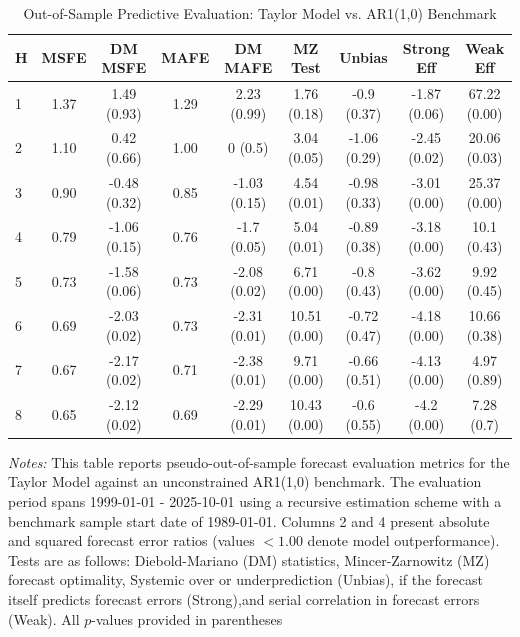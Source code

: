 \begin{table}[htbp]
\centering
\caption{Out-of-Sample Predictive Evaluation: Taylor Model vs. AR1(1,0) Benchmark}
\label{tab:taylor_model_evaluation}
\footnotesize
\begin{tabular}{l cccccccc}
\hline\hline
\rule{0pt}{3ex}
\textbf{H} & \textbf{MSFE} & \textbf{DM MSFE} & \textbf{MAFE} & \textbf{DM MAFE} & \textbf{MZ Test} & \textbf{Unbias} & \textbf{Strong Eff} & \textbf{Weak Eff} \\[0.5ex]
\hline
\rule{0pt}{2.5ex}
1 & 1.37 & 1.49 (0.93) & 1.29 & 2.23 (0.99) & 1.76 (0.18) & -0.9 (0.37) & -1.87 (0.06) & 67.22 (0.00) \\
2 & 1.10 & 0.42 (0.66) & 1.00 & 0 (0.5) & 3.04 (0.05) & -1.06 (0.29) & -2.45 (0.02) & 20.06 (0.03) \\
3 & 0.90 & -0.48 (0.32) & 0.85 & -1.03 (0.15) & 4.54 (0.01) & -0.98 (0.33) & -3.01 (0.00) & 25.37 (0.00) \\
4 & 0.79 & -1.06 (0.15) & 0.76 & -1.7 (0.05) & 5.04 (0.01) & -0.89 (0.38) & -3.18 (0.00) & 10.1 (0.43) \\
5 & 0.73 & -1.58 (0.06) & 0.73 & -2.08 (0.02) & 6.71 (0.00) & -0.8 (0.43) & -3.62 (0.00) & 9.92 (0.45) \\
6 & 0.69 & -2.03 (0.02) & 0.73 & -2.31 (0.01) & 10.51 (0.00) & -0.72 (0.47) & -4.18 (0.00) & 10.66 (0.38) \\
7 & 0.67 & -2.17 (0.02) & 0.71 & -2.38 (0.01) & 9.71 (0.00) & -0.66 (0.51) & -4.13 (0.00) & 4.97 (0.89) \\
8 & 0.65 & -2.12 (0.02) & 0.69 & -2.29 (0.01) & 10.43 (0.00) & -0.6 (0.55) & -4.2 (0.00) & 7.28 (0.7) \\
\hline\hline
\end{tabular}%
\par\smallskip
\parbox{\textwidth}{\scriptsize \textit{Notes:} This table reports pseudo-out-of-sample forecast evaluation metrics for the Taylor Model against an unconstrained AR1(1,0) benchmark. The evaluation period spans 1999-01-01 - 2025-10-01 using a recursive estimation scheme with a benchmark sample start date of 1989-01-01. Columns 2 and 4 present absolute and squared forecast error ratios (values $< 1.00$ denote model outperformance). Tests are as follows: Diebold-Mariano (DM) statistics, Mincer-Zarnowitz (MZ) forecast optimality, Systemic over or underprediction (Unbias), if the forecast itself predicts forecast errors (Strong),and serial correlation in forecast errors (Weak). All $p$-values provided in parentheses}
\end{table}
